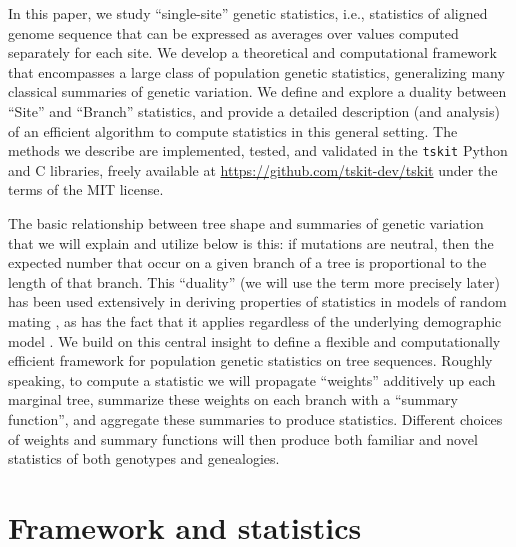 \documentclass[9pt,twoside,lineno]{gsajnl}
\newcommand{\tskit}{{\texttt{tskit}}}
\begin{document}
In this paper, we study ``single-site'' genetic statistics,
i.e., statistics of aligned genome sequence that can be expressed as averages over values computed
separately for each site. We develop a theoretical and computational framework
that encompasses a large class of population genetic statistics, generalizing
many classical summaries of genetic variation. We define
and explore a duality between ``Site'' and ``Branch'' statistics, and
provide a detailed description (and analysis) of an efficient algorithm
to compute statistics in this general setting.
The methods we describe are implemented, tested, and validated in the \tskit{}
Python and C libraries, freely available at \url{https://github.com/tskit-dev/tskit}
under the terms of the MIT license.

The basic relationship between tree shape and summaries of genetic variation
that we will explain and utilize below is this:
if mutations are neutral, then the expected number that occur on a
given branch of a tree is proportional to the length of that branch.
This ``duality'' (we will use the term more precisely later) has been
used extensively in deriving properties of statistics in models of random mating
\citep[e.g.,][]{tajima1983evolutionary,tavare1984lineofdescent,fu1995statistical},
as has the fact that it applies regardless of the underlying demographic model
\citep[e.g.,][]{gillespie1979evolutionary,hudson1983properties,slatkin1991inbreeding,
mcvean2002genealogical,lohse2016efficient,ralph2019empirical}. We build on this central
insight to define a flexible and computationally efficient framework for
population genetic statistics on tree sequences.
Roughly speaking, to compute a statistic we will
propagate ``weights'' additively up each marginal tree,
summarize these weights on each branch with a ``summary function'',
and aggregate these summaries to produce statistics.
Different choices of weights and summary functions
will then produce both familiar and novel statistics
of both genotypes and genealogies.

\section*{Framework and statistics}
\end{document}
